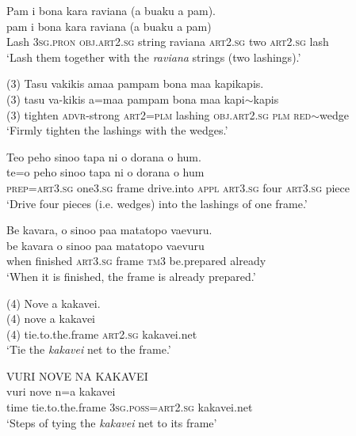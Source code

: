 \ea\label{ex:text22-65}
Pam i bona kara raviana (a buaku a pam).\\
\gll pam	i	bona	kara	raviana	(a	buaku	a	pam)\\
     Lash	3\textsc{sg}.\textsc{pron}	\textsc{obj}.\textsc{art}2.\textsc{sg}	string	raviana	\textsc{art}2.\textsc{sg}	two	\textsc{art}2.\textsc{sg}	lash\\
\glt `Lash them together with the \textit{raviana} strings (two lashings).'
\z

\ea\label{ex:text22-66}
(3) Tasu vakikis amaa pampam bona maa kapikapis.\\
\gll (3)	tasu	va-kikis	a=maa	pampam	bona	maa	kapi{$\sim$}kapis\\
     (3)	tighten	\textsc{advr}-strong	\textsc{art}2=\textsc{plm}	lashing	\textsc{obj}.\textsc{art}2.\textsc{sg}	\textsc{plm}	\textsc{red}{$\sim$}wedge\\
\glt `Firmly tighten the lashings with the wedges.'
\z

\ea\label{ex:text22-67}
Teo peho sinoo tapa ni o dorana o hum.\\
\gll te=o	peho	sinoo	tapa	ni	o	dorana	o	hum\\
     \textsc{prep}=\textsc{art}3.\textsc{sg}	one3.\textsc{sg}	frame	drive.into	\textsc{appl}	\textsc{art}3.\textsc{sg}	four	\textsc{art}3.\textsc{sg}	piece\\
\glt `Drive four pieces (i.e. wedges) into the lashings of one frame.'
\z

\ea\label{ex:text22-68}
Be kavara, o sinoo paa matatopo vaevuru.\\
\gll be	kavara	o	sinoo	paa	matatopo	vaevuru\\
     when	finished	\textsc{art}3.\textsc{sg}	frame	\textsc{tm}3	be.prepared	already\\
\glt `When it is finished, the frame is already prepared.'
\z

\newpage
\ea\label{ex:text22-69}
(4) Nove a kakavei.\\
\gll (4)	nove	a	kakavei\\
     (4)	tie.to.the.frame	\textsc{art}2.\textsc{sg}	kakavei.net\\
\glt `Tie the \textit{kakavei} net to the frame.'
\z

\ea\label{ex:text22-70}
VURI NOVE NA KAKAVEI\\
\gll vuri	nove	n=a	kakavei\\
     time	tie.to.the.frame	3\textsc{sg}.\textsc{poss}=\textsc{art}2.\textsc{sg}	kakavei.net\\
\glt `Steps of tying the \textit{kakavei} net to its frame'
\z

